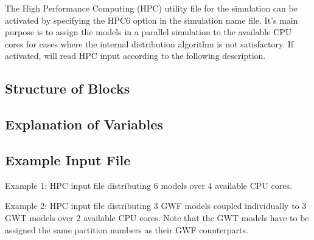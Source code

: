 The High Performance Computing (HPC) utility file for the simulation can be activated by specifying the HPC6 option in the simulation name file.  It's main purpose is to assign the models in a parallel simulation to the available CPU cores for cases where the internal distribution algorithm is not satisfactory. If activated, \mf will read HPC input according to the following description.

\vspace{5mm}
\subsection{Structure of Blocks}



\vspace{5mm}
\subsection{Explanation of Variables}
\begin{description}

\end{description}

\vspace{5mm}
\subsection{Example Input File}
Example 1: HPC input file distributing 6 models over 4 available CPU cores.


\vspace{5mm}
Example 2: HPC input file distributing 3 GWF models coupled individually to 3 GWT models over 2 available CPU cores. Note that the GWT models have to be assigned the same partition numbers as their GWF counterparts.
